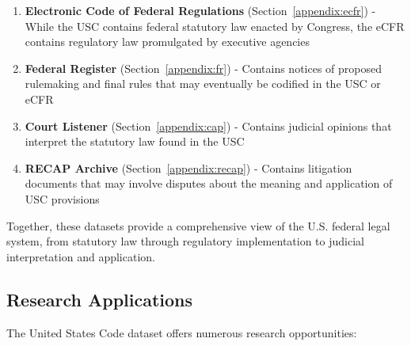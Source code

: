 \begin{enumerate}
    \item \textbf{Electronic Code of Federal Regulations} (Section~\ref{appendix:ecfr}) - While the USC contains federal statutory law enacted by Congress, the eCFR contains regulatory law promulgated by executive agencies
    
    \item \textbf{Federal Register} (Section~\ref{appendix:fr}) - Contains notices of proposed rulemaking and final rules that may eventually be codified in the USC or eCFR
    
    \item \textbf{Court Listener} (Section~\ref{appendix:cap}) - Contains judicial opinions that interpret the statutory law found in the USC
    
    \item \textbf{RECAP Archive} (Section~\ref{appendix:recap}) - Contains litigation documents that may involve disputes about the meaning and application of USC provisions
\end{enumerate}

Together, these datasets provide a comprehensive view of the U.S. federal legal system, from statutory law through regulatory implementation to judicial interpretation and application.

\subsection{Research Applications}

The United States Code dataset offers numerous research opportunities:

